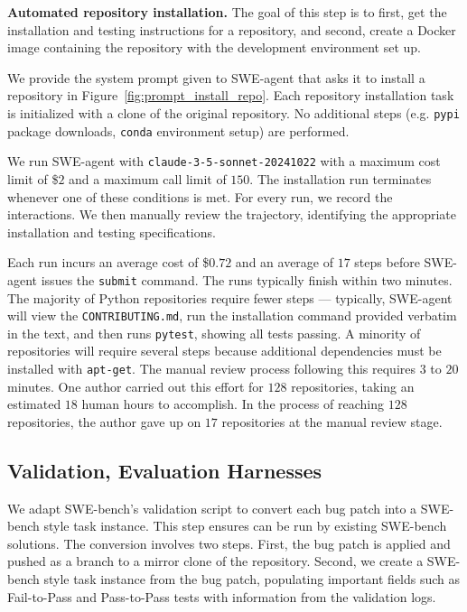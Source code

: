 \textbf{Automated repository installation.}
The goal of this step is to first, get the installation and testing instructions for a repository, and second, create a Docker image containing the repository with the development environment set up.

We provide the system prompt given to SWE-agent that asks it to install a repository in Figure~\ref{fig:prompt_install_repo}.
Each repository installation task is initialized with a clone of the original repository.
No additional steps (e.g. \texttt{pypi} package downloads, \texttt{conda} environment setup) are performed.

We run SWE-agent with \texttt{claude-3-5-sonnet-20241022} with a maximum cost limit of \$$2$ and a maximum call limit of $150$.
The installation run terminates whenever one of these conditions is met.
For every run, we record the interactions.
We then manually review the trajectory, identifying the appropriate installation and testing specifications.

Each run incurs an average cost of \$$0.72$ and an average of $17$ steps before SWE-agent issues the \texttt{submit} command.
The runs typically finish within two minutes.
The majority of Python repositories require fewer steps --- typically, SWE-agent will view the \texttt{CONTRIBUTING.md}, run the installation command provided verbatim in the text, and then runs \texttt{pytest}, showing all tests passing.
A minority of repositories will require several steps because additional dependencies must be installed with \texttt{apt-get}.
The manual review process following this requires $3$ to $20$ minutes.
One author carried out this effort for $128$ repositories, taking an estimated $18$ human hours to accomplish.
In the process of reaching $128$ repositories, the author gave up on $17$ repositories at the manual review stage.



\subsection{Validation, Evaluation Harnesses}
\label{appx:infra:harnesses}
We adapt SWE-bench's validation script to convert each bug patch into a SWE-bench style task instance.
This step ensures \bugs{} can be run by existing SWE-bench solutions.
The conversion involves two steps.
First, the bug patch is applied and pushed as a branch to a mirror clone of the repository.
Second, we create a SWE-bench style task instance from the bug patch, populating important fields such as Fail-to-Pass and Pass-to-Pass tests with information from the validation logs.


